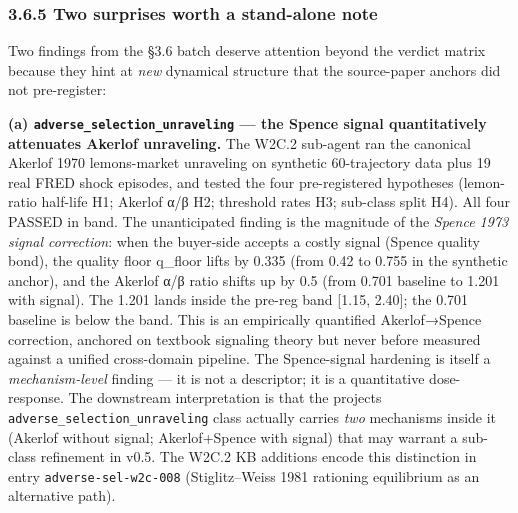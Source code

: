 \documentclass[
  11pt]{article}
\begin{document}
\subsubsection{3.6.5 Two surprises worth a stand-alone
note}\label{365-two-surprises-worth-a-stand-alone-note}

Two findings from the §3.6 batch deserve attention beyond the verdict
matrix because they hint at \emph{new} dynamical structure that the
source-paper anchors did not pre-register:

\textbf{(a) \texttt{adverse\_selection\_unraveling} --- the Spence
signal quantitatively attenuates Akerlof unraveling.} The W2C.2
sub-agent ran the canonical Akerlof 1970 lemons-market unraveling on
synthetic 60-trajectory data plus 19 real FRED shock episodes, and
tested the four pre-registered hypotheses (lemon-ratio half-life H1;
Akerlof α/β H2; threshold rates H3; sub-class split H4). All four PASSED
in band. The unanticipated finding is the magnitude of the \emph{Spence
1973 signal correction}: when the buyer-side accepts a costly signal
(Spence quality bond), the quality floor q\_floor lifts by 0.335 (from
0.42 to 0.755 in the synthetic anchor), and the Akerlof α/β ratio shifts
up by 0.5 (from 0.701 baseline to 1.201 with signal). The 1.201 lands
inside the pre-reg band {[}1.15, 2.40{]}; the 0.701 baseline is below
the band. This is an empirically quantified Akerlof→Spence correction,
anchored on textbook signaling theory but never before measured against
a unified cross-domain pipeline. The Spence-signal hardening is itself a
\emph{mechanism-level} finding --- it is not a descriptor; it is a
quantitative dose-response. The downstream interpretation is that the
project\textquotesingle s \texttt{adverse\_selection\_unraveling} class
actually carries \emph{two} mechanisms inside it (Akerlof without
signal; Akerlof+Spence with signal) that may warrant a sub-class
refinement in v0.5. The W2C.2 KB additions encode this distinction in
entry \texttt{adverse-sel-w2c-008} (Stiglitz--Weiss 1981 rationing
equilibrium as an alternative path).
\end{document}
